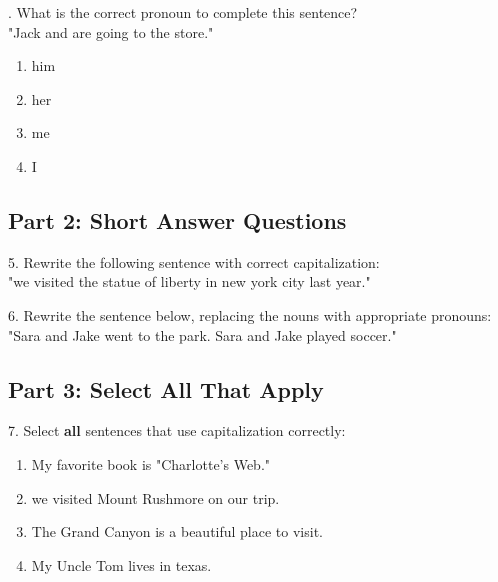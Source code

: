\documentclass[12pt]{article}
\begin{document}
\vspace{1cm}
. What is the correct pronoun to complete this sentence?\\
"Jack and \underline{\hspace{1cm}} are going to the store."\\
\begin{enumerate}[label=\Alph*.]
    \item him  
    \item her  
    \item me  
    \item I  
\end{enumerate}

\vspace{0.2cm}


\subsection*{Part 2: Short Answer Questions}

5. Rewrite the following sentence with correct capitalization: \\
"we visited the statue of liberty in new york city last year."\\
\vspace{3cm}

6. Rewrite the sentence below, replacing the nouns with appropriate pronouns: \\
"Sara and Jake went to the park. Sara and Jake played soccer."\\
\vspace{3cm}

\subsection*{Part 3: Select All That Apply}

7. Select \textbf{all} sentences that use capitalization correctly:\\
\begin{enumerate}[label=\Alph*.]
    \item My favorite book is "Charlotte's Web."  
    \item we visited Mount Rushmore on our trip.  
    \item The Grand Canyon is a beautiful place to visit.  
    \item My Uncle Tom lives in texas.  
\end{enumerate}

\vspace{1cm}
\end{document}
